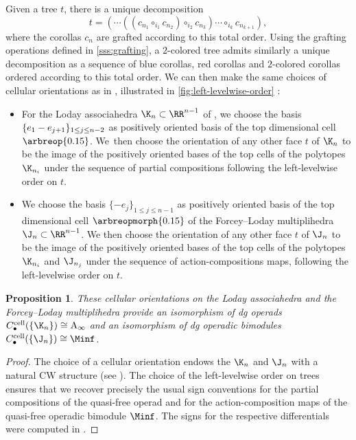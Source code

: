 \documentclass[JEP,XML,SOM,NoFloatCountersInSection,Unicode,published]{cedram}
\theoremstyle{definition}
\theoremstyle{plain}
\newtheorem{proposition}[definition]{Proposition}
\begin{document}
Given a tree $t$, there is a unique decomposition
\[
t=(\cdots ((c_{n_1} \circ_{i_1} c_{n_2})\circ_{i_2}c_{n_3})\cdots \circ_{i_k} c_{n_{k+1}}),
\]
where the corollas $c_n$ are grafted according to this total order. Using the grafting operations defined in \cref{sss:grafting}, a $2$-colored tree admits similarly a unique decomposition as a sequence of blue corollas, red corollas and $2$-colored corollas ordered according to this total order.
We can then make the same choices of cellular orientations as in \cite[\S 1.4]{mazuir-I}, illustrated in \cref{fig:left-levelwise-order} :
\begin{itemize}
\item For the Loday associahedra $\K_n \subset \RR^{n-1}$ of \cite{MTTV19}, we choose the basis $\{e_1 -\nobreak e_{j+1}\}_{1\leq j \leq n-2}$ as positively oriented basis of the top dimensional cell $\arbreop{0.15}$. We~then choose the orientation of any other face $t$ of $\K_n$ to be the image of the positively oriented bases of the top cells of the polytopes $\K_{n_i}$ under the sequence of partial compositions following the left-levelwise order on $t$.
\item We choose the basis $\{- e_j\}_{1\leq j \leq n-1}$ as positively oriented basis of the top dimensional cell $\arbreopmorph{0.15}$ of the Forcey--Loday multiplihedra $\J_n \subset \RR^{n-1}$. We then choose the orientation of any other face $t$ of $\J_n$ to be the image of the positively oriented bases of the top cells of the polytopes $\K_{n_i}$ and $\J_{n_j}$ under the sequence of action-compositions maps, following the left-levelwise order on $t$.
\end{itemize}

\begin{proposition}
\label{prop:cellular-chains}
These cellular orientations on the Loday associahedra and the Forcey--Loday multiplihedra provide an isomorphism of dg operads $C_\bullet^{\mathrm{cell}}(\{\K_n\})\cong \mathrm{A}_\infty$ and an isomorphism of dg operadic bimodules $C_\bullet^{\mathrm{cell}}(\{\J_n\})\cong \Minf$.
\end{proposition}

\begin{proof}
The choice of a cellular orientation endows the $\K_n$ and $\J_n$ with a natural CW structure (see \cite[Prop.\,4.22]{LA21}).
The choice of the left-levelwise order on trees ensures that we recover precisely the usual sign conventions for the partial compositions of the quasi-free operad \Ainf and for the action-composition maps of the quasi-free operadic bimodule $\Minf$.
The signs for the respective differentials were computed in \cite[\S 1.4]{mazuir-I}.
\end{proof}
\end{document}
